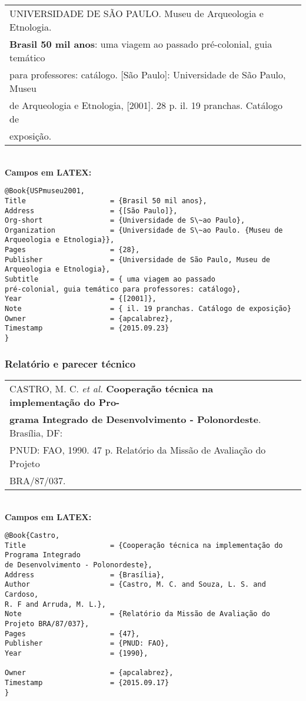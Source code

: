 \begin{tabular}{|l|c|} \hline
	UNIVERSIDADE DE SÃO PAULO. Museu de Arqueologia e Etnologia.  \\ \textbf{Brasil 50 mil anos}: uma viagem ao passado pré-colonial, guia temático \\ para professores: catálogo. [São Paulo]: Universidade de São Paulo, Museu \\ de
	Arqueologia e Etnologia, [2001]. 28 p. il. 19 pranchas. Catálogo de \\ exposição.   \\\hline
\end{tabular}\\

\textbf{Campos em LATEX:}

\begin{verbatim}
@Book{USPmuseu2001,
Title                    = {Brasil 50 mil anos},
Address                  = {[São Paulo]},
Org-short                = {Universidade de S\~ao Paulo},
Organization             = {Universidade de S\~ao Paulo. {Museu de 
Arqueologia e Etnologia}},
Pages                    = {28},
Publisher                = {Universidade de São Paulo, Museu de 
Arqueologia e Etnologia},
Subtitle                 = { uma viagem ao passado
pré-colonial, guia temático para professores: catálogo},
Year                     = {[2001]},
Note                     = { il. 19 pranchas. Catálogo de exposição}
Owner                    = {apcalabrez},
Timestamp                = {2015.09.23}
}
\end{verbatim}

\subsubsection{Relatório e parecer técnico}

\begin{tabular}{|l|c|} \hline
	CASTRO, M. C. \textit{et al.} \textbf{Cooperação técnica na implementação do
		Pro-}\\\textbf{grama Integrado de Desenvolvimento - Polonordeste}. Brasília, DF: \\ PNUD: FAO, 1990. 47 p. Relatório da Missão de Avaliação do Projeto \\ BRA/87/037.     \\\hline
\end{tabular}\\

\textbf{Campos em LATEX:}

\begin{verbatim}
@Book{Castro,
Title                    = {Cooperação técnica na implementação do 
Programa Integrado 
de Desenvolvimento - Polonordeste},
Address                  = {Brasília},
Author                   = {Castro, M. C. and Souza, L. S. and Cardoso, 
R. F and Arruda, M. L.},
Note                     = {Relatório da Missão de Avaliação do 
Projeto BRA/87/037},
Pages                    = {47},
Publisher                = {PNUD: FAO},
Year                     = {1990},

Owner                    = {apcalabrez},
Timestamp                = {2015.09.17}
}
\end{verbatim}

